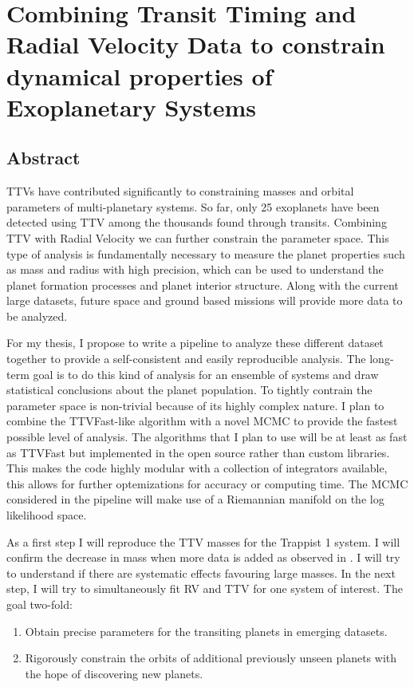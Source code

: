 \section{Combining Transit Timing and Radial Velocity Data to constrain dynamical properties of Exoplanetary Systems}

\subsection{Abstract}
TTVs have contributed significantly to constraining masses and orbital parameters of multi-planetary systems.
So far, only 25 exoplanets have been detected using TTV among the thousands found through transits.
Combining TTV with Radial Velocity we can further constrain the parameter space.
This type of analysis is fundamentally necessary to measure the planet properties such as mass and radius with high precision, which can be used to understand the planet formation processes and planet interior structure. 
Along with the current large datasets, future space and ground based missions will provide more data to be analyzed.

For my thesis, I propose to write a pipeline to analyze these different dataset together to provide a self-consistent and easily reproducible analysis. 
The long-term goal is to do this kind of analysis for an ensemble of systems and draw statistical conclusions about the planet population.
To tightly contrain the parameter space is non-trivial because of its highly complex nature.
I plan to combine the TTVFast-like algorithm with a novel MCMC to provide the fastest possible level of analysis.
The algorithms that I plan to use will be at least as fast as TTVFast but implemented in the open source \reb rather than custom libraries.
This makes the code highly modular with a collection of integrators available, this allows for further optemizations for accuracy or computing time.
The MCMC considered in the pipeline will make use of a Riemannian manifold on the log likelihood space.

As a first step I will reproduce the TTV masses for the Trappist 1 system. 
I will confirm the decrease in mass when more data is added as observed in \cite{1704.04290}.
I will try to understand if there are systematic effects favouring large masses.
In the next step, I will try to simultaneously fit RV and TTV for one system of interest. 
The goal two-fold:
\begin{enumerate} 
	\item Obtain precise parameters for the transiting planets in emerging datasets.
	\item Rigorously constrain the orbits of additional previously unseen planets with the hope of discovering new planets.
\end{enumerate}